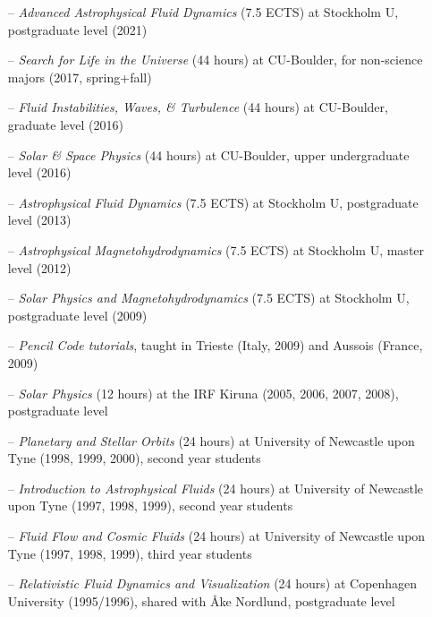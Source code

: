 \documentclass{article}
\begin{document}
\begin{itemize}

\item[--] {\it Advanced Astrophysical Fluid Dynamics}
(7.5 ECTS) at Stockholm U, postgraduate level (2021)

\item[--] {\it Search for Life in the Universe}
(44 hours) at CU-Boulder, for non-science majors (2017, spring+fall)

\item[--] {\it Fluid Instabilities, Waves, \& Turbulence}
(44 hours) at CU-Boulder, graduate level (2016)

\item[--] {\it Solar \& Space Physics}
(44 hours) at CU-Boulder, upper undergraduate level (2016)

\item[--] {\it Astrophysical Fluid Dynamics}
(7.5 ECTS) at Stockholm U, postgraduate level (2013)

\item[--] {\it Astrophysical Magnetohydrodynamics}
(7.5 ECTS) at Stockholm U, master level (2012)

\item[--] {\it Solar Physics and Magnetohydrodynamics}
(7.5 ECTS) at Stockholm U, postgraduate level (2009)

\item[--] {\it Pencil Code tutorials},
taught in Trieste (Italy, 2009) and Aussois (France, 2009)

\item[--] {\it Solar Physics}
(12 hours) at the IRF Kiruna (2005, 2006, 2007, 2008), postgraduate level

\item[--] {\it Planetary and Stellar Orbits}
(24 hours) at University of Newcastle upon Tyne (1998, 1999, 2000),
second year students

\item[--] {\it Introduction to Astrophysical Fluids}
(24 hours) at University of Newcastle upon Tyne (1997, 1998, 1999),
second year students

\item[--] {\it Fluid Flow and Cosmic Fluids}
(24 hours) at University of Newcastle upon Tyne (1997, 1998, 1999),
third year students

\item[--] {\it Relativistic Fluid Dynamics and Visualization}
(24 hours) at Copenhagen University (1995/1996), shared with {\AA}ke Nordlund,
postgraduate level

\end{itemize}
\end{document}
